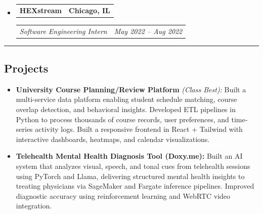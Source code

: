 \documentclass[11pt,letterpaper]{article}
\makeatletter
\newcommand{\headerrow}[2]
{\begin{tabular*}{\linewidth}{l@{\extracolsep{\fill}}r}
#1 &
#2 \\
\end{tabular*}}
\makeatother
\begin{document}
\begin{itemize}[leftmargin=1em]
	\item
	      \headerrow
	      {\textbf{HEXstream}}
	      {\textbf{Chicago, IL}}
	      \headerrow
	      {\emph{Software Engineering Intern}}
	      {\emph{May 2022 -- Aug 2022}}
\end{itemize}
\hrule
{}

\vspace{-1em}
\subsection*{\Large Projects}
\begin{itemize}[leftmargin=1em,noitemsep]
\item \textbf{University Course Planning/Review Platform} \emph{(Class Best):} Built a multi-service data platform enabling student schedule matching, course overlap detection, and behavioral insights. Developed ETL pipelines in Python to process thousands of course records, user preferences, and time-series activity logs. Built a responsive frontend in React + Tailwind with interactive dashboards, heatmaps, and calendar visualizations.
\item \textbf{Telehealth Mental Health Diagnosis Tool (Doxy.me):} Built an AI system that analyzes visual, speech, and tonal cues from telehealth sessions using PyTorch and Llama, delivering structured mental health insights to treating physicians via SageMaker and Fargate inference pipelines. Improved diagnostic accuracy using reinforcement learning and WebRTC video integration.
\end{itemize}
\end{document}
